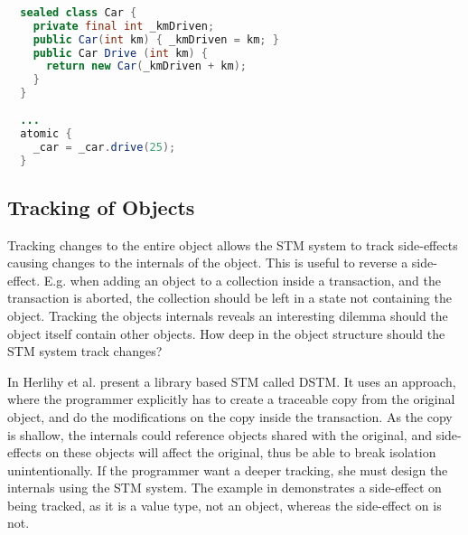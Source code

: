 %
\begin{lstlisting}[label=lst:tracking_variable,
  float,
  caption={Tracking Assignment to Variables},
  language=Java,  
  showspaces=false,
  showtabs=false,
  breaklines=true,
  showstringspaces=false,
  breakatwhitespace=true,
  commentstyle=\color{greencomments},
  keywordstyle=\color{bluekeywords},
  stringstyle=\color{redstrings},
  morekeywords={atomic, retry, orElse, var, get, set, sealed}]  % Start your code-block
  
  sealed class Car {
    private final int _kmDriven;
    public Car(int km) { _kmDriven = km; }
    public Car Drive (int km) { 
      return new Car(_kmDriven + km); 
    }
  }
  
  ...
  atomic {
    _car = _car.drive(25);
  }
\end{lstlisting}
%
\subsection{Tracking of Objects}
Tracking changes to the entire object allows the \ac{STM} system to track side-effects causing changes to the internals of the object. This is useful to reverse a side-effect. E.g. when adding an object to a collection inside a transaction, and the transaction is aborted, the collection should be left in a state not containing the object. Tracking the objects internals reveals an interesting dilemma should the object itself contain other objects. How deep in the object structure should the \ac{STM} system track changes? 

In \cite{herlihy2003software} Herlihy et al. present a library based \ac{STM} called \ac{DSTM}. It uses an approach, where the programmer explicitly has to create a traceable copy from the original object, and do the modifications on the copy inside the transaction. As the copy is shallow, the internals could reference objects shared with the original, and side-effects on these objects will affect the original, thus be able to break isolation unintentionally. If the programmer want a deeper tracking, she must design the internals using the \ac{STM} system. The example in  demonstrates a side-effect on  being tracked, as it is a value type, not an object, whereas the side-effect on  is not.

